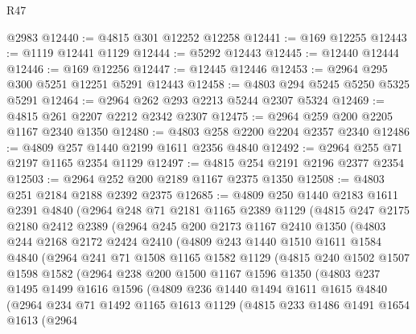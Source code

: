 \begin{lexlean}{R47}
\begin{coremodule}
    @2983
@12440 := @4815 @301 @12252 @12258
@12441 := @169 @12255
@12443 := @1119 @12441 @1129
@12444 := @5292 @12443
@12445 := @12440 @12444
@12446 := @169 @12256
@12447 := @12445 @12446
@12453 := @2964 @295 @300 @5251 @12251 @5291 @12443
@12458 := @4803 @294 @5245 @5250 @5325 @5291
@12464 := @2964 @262 @293 @2213 @5244 @2307 @5324
@12469 := @4815 @261 @2207 @2212 @2342 @2307
@12475 := @2964 @259 @200 @2205 @1167 @2340 @1350
@12480 := @4803 @258 @2200 @2204 @2357 @2340
@12486 := @4809 @257 @1440 @2199 @1611 @2356 @4840
@12492 := @2964 @255 @71 @2197 @1165 @2354 @1129
@12497 := @4815 @254 @2191 @2196 @2377 @2354
@12503 := @2964 @252 @200 @2189 @1167 @2375 @1350
@12508 := @4803 @251 @2184 @2188 @2392 @2375
@12685 := @4809
    @250
    @1440
    @2183
    @1611
    @2391
    @4840
    (@2964
      @248
      @71
      @2181
      @1165
      @2389
      @1129
      (@4815
        @247
        @2175
        @2180
        @2412
        @2389
        (@2964
          @245
          @200
          @2173
          @1167
          @2410
          @1350
          (@4803
            @244
            @2168
            @2172
            @2424
            @2410
            (@4809
              @243
              @1440
              @1510
              @1611
              @1584
              @4840
              (@2964
                @241
                @71
                @1508
                @1165
                @1582
                @1129
                (@4815
                  @240
                  @1502
                  @1507
                  @1598
                  @1582
                  (@2964
                    @238
                    @200
                    @1500
                    @1167
                    @1596
                    @1350
                    (@4803
                      @237
                      @1495
                      @1499
                      @1616
                      @1596
                      (@4809
                        @236
                        @1440
                        @1494
                        @1611
                        @1615
                        @4840
                        (@2964
                          @234
                          @71
                          @1492
                          @1165
                          @1613
                          @1129
                          (@4815
                            @233
                            @1486
                            @1491
                            @1654
                            @1613
                            (@2964

\end{coremodule}
\end{lexlean}
